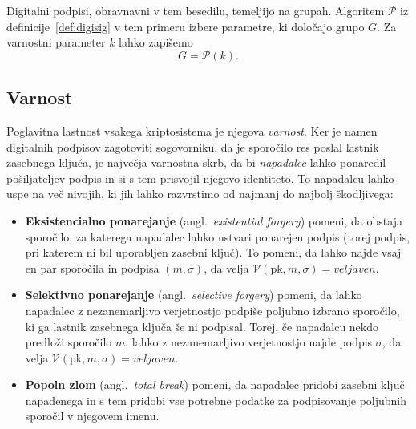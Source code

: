 \documentclass[isrm2, tisk]{fmfdelo}
\begin{document}
\begin{primer}
    Digitalni podpisi, obravnavni v tem besedilu, temeljijo na grupah. Algoritem $\mathcal{P}$ iz
    definicije~\ref{def:digisig} v tem primeru izbere parametre, ki določajo grupo $G$. Za varnostni
    parameter $k$ lahko zapišemo 
    $$
    G = \mathcal{P}(k).
    $$
\end{primer}

\subsection{Varnost}
Poglavitna lastnost vsakega kriptosistema je njegova \textit{varnost}. Ker je namen digitalnih podpisov
zagotoviti sogovorniku, da je sporočilo res poslal lastnik zasebnega ključa, je največja varnostna
skrb, da bi \textit{napadalec} lahko ponaredil pošiljateljev podpis in si s tem prisvojil njegovo
identiteto. To napadalcu lahko uspe na več nivojih, ki jih lahko razvrstimo od najmanj do najbolj
škodljivega:

\begin{itemize}
    \item \textbf{Eksistencialno ponarejanje} (angl.\ \textit{existential forgery}) pomeni, da obstaja
        sporočilo, za katerega napadalec lahko ustvari ponarejen podpis (torej podpis, pri katerem
        ni bil uporabljen zasebni ključ). To pomeni, da lahko najde vsaj en par sporočila in podpisa
        $(m, \sigma)$, da velja $\mathcal{V}(\text{pk}, m, \sigma) = veljaven$.
    \item \textbf{Selektivno ponarejanje} (angl.\ \textit{selective forgery}) pomeni, da lahko napadalec
        z nezanemarljivo verjetnostjo podpiše poljubno izbrano sporočilo, ki ga lastnik zasebnega
        ključa še ni podpisal. Torej, če napadalcu nekdo predloži sporočilo $m$, lahko z nezanemarljivo
        verjetnostjo najde podpis $\sigma$, da velja $\mathcal{V}(\text{pk}, m, \sigma) = veljaven$.
    \item \textbf{Popoln zlom} (angl.\ \textit{total break}) pomeni, da napadalec pridobi
        zasebni ključ napadenega in s tem pridobi vse potrebne podatke za podpisovanje poljubnih
        sporočil v njegovem imenu.
\end{itemize}
\end{document}
